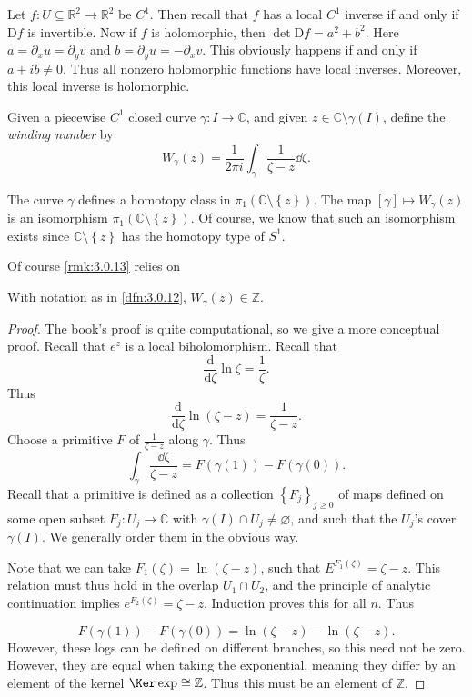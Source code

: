 
Let $f : U\subseteq \mathbb{R} ^2 \to \mathbb{R} ^2$ be $C^1$. Then recall that $f$ has a local $C^1$ inverse if and only if $\mathrm{D} f$ is invertible. Now if $f$ is holomorphic, then $\det \mathrm{D} f = a^2 + b^2$. Here $a = \partial _xu = \partial _yv$ and $b = \partial _yu = -\partial _xv$. This obviously happens if and only if $a+ib \neq 0$. Thus all nonzero holomorphic functions have local inverses. Moreover, this local inverse is holomorphic.

\begin{definition}\label{dfn:3.0.12}
	Given a piecewise $C^1$ closed curve $\gamma : I \to \mathbb{C} $, and given $z\in\mathbb{C} \setminus \gamma (I)$, define the \emph{winding number} by
	\[
		W_{\gamma } (z)=\frac{1}{2\pi i} \int_{\gamma } \frac{1}{\zeta -z} \dd \zeta 
	.\]
\end{definition}
\begin{remark}\label{rmk:3.0.13}
	The curve $\gamma $ defines a homotopy class in $ \pi _1(\mathbb{C} \setminus \left\{ z \right\} )$. The map $[\gamma ]\mapsto W_\gamma (z)$ is an isomorphism $\pi _1(\mathbb{C} \setminus \left\{ z \right\} )$. Of course, we know that such an isomorphism exists since $\mathbb{C} \setminus \left\{ z \right\} $ has the homotopy type of $S^1$.
\end{remark}

Of course \cref{rmk:3.0.13} relies on
\begin{proposition}\label{prp:3.0.14}
	With notation as in \cref{dfn:3.0.12}, $W_\gamma (z)\in\mathbb{Z} $.
\end{proposition}
\begin{proof}
	The book's proof is quite computational, so we give a more conceptual proof. Recall that $e^z$ is a local biholomorphism. Recall that
	\[
		\frac{\mathrm{d}}{\mathrm{d}\zeta } \ln \zeta =\frac{1}{\zeta } 
	.\]
	Thus
	\[
		\frac{\mathrm{d}}{\mathrm{d}\zeta } \ln (\zeta -z)=\frac{1}{\zeta -z} 
	.\]
	Choose a primitive $F$ of $\frac{1}{\zeta -z} $ along $\gamma $. Thus
	\[
		\int_{\gamma } \frac{\dd \zeta }{\zeta -z} =F(\gamma (1)) - F(\gamma (0))
	.\]
	Recall that a primitive is defined as a collection $\left\{ F_j \right\}_{j\geq 0} $ of maps defined on some open subset $F_j : U_j \to \mathbb{C} $ with $\gamma (I) \cap U_j \neq \varnothing $, and such that the $U_j$'s cover $\gamma (I)$. We generally order them in the obvious way.

	Note that we can take $F_1(\zeta )=\ln (\zeta -z)$, such that $E^{F_1(\zeta )} =\zeta -z$. This relation must thus hold in the overlap $U_1 \cap U_2$, and the principle of analytic continuation implies $e^{F_2(\zeta )} =\zeta -z$. Induction proves this for all $n$. Thus

	\[
		F(\gamma (1)) - F(\gamma (0)) = \ln (\zeta -z) - \ln (\zeta -z)
	.\]
	However, these logs can be defined on different branches, so this need not be zero. However, they are equal when taking the exponential, meaning they differ by an element of the kernel $\Ker \exp \cong \mathbb{Z} $. Thus this must be an element of $\mathbb{Z} $.
\end{proof}

